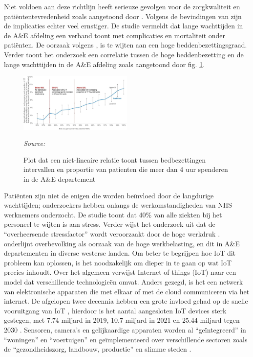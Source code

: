 Niet voldoen aan deze richtlijn heeft serieuze gevolgen voor de zorgkwaliteit en patiëntentevredenheid zoals aangetoond door \autocite{Vainieri2020}. Volgens de bevindingen van \autocite{Paling2020} zijn de implicaties echter veel ernstiger. De studie vermeldt dat lange wachttijden in de A\&E afdeling een verband toont met complicaties en mortaliteit onder patiënten. De oorzaak volgens \autocite{Paling2020}, is te wijten aan een hoge beddenbezettingsgraad. Verder toont het onderzoek een correlatie tussen de hoge beddenbezetting en de lange wachttijden in de A\&E afdeling zoals aangetoond door fig. \ref{fig:Figuur2}.


\begin{figure}[h]
    \centering
    \includegraphics[width=0.5\textwidth]{img/Figuur-2}
    \caption{Plot dat een niet-lineaire relatie toont tussen bedbezettingen intervallen en proportie van patienten die meer dan 4 uur spenderen in de A\&E departement}
    \label{fig:Figuur2}
    \textit{Source: \autocite{Paling2020}}
\end{figure}

Patiënten zijn niet de enigen die worden beïnvloed door de langdurige wachttijden; onderzoekers hebben onlangs de werkomstandigheden van NHS werknemers onderzocht. De studie toont dat 40\% van alle ziekten bij het personeel te wijten is aan stress. Verder wijst het onderzoek uit dat de “overheersende stressfactor” wordt veroorzaakt door de hoge werkdruk \autocite{Ravalier2020}. \autocite{Vainieri2020} onderlijnt overbevolking als oorzaak van de hoge werkbelasting, en dit in A\&E departementen in diverse westerse landen. Om beter te begrijpen hoe IoT dit probleem kan oplossen, is het noodzakelijk om dieper in te gaan op wat IoT precies inhoudt. Over het algemeen verwijst Internet of things (IoT) naar een model dat verschillende technologieën omvat. Anders gezegd, is het een netwerk van elektronische apparaten die met elkaar of met de cloud communiceren via het internet. De afgelopen twee decennia hebben een grote invloed gehad op de snelle vooruitgang van IoT \autocite{Almutairi2024}, hierdoor is het aantal aangesloten IoT devices sterk gestegen, met 7.74 miljard in 2019, 10.7 miljard in 2021 \autocite{Dawod2022} en 25.44 miljard tegen 2030 \autocite{Dawod2022}. Sensoren, camera's en gelijkaardige apparaten worden al “geïntegreerd” in “woningen” en “voertuigen” \autocite{Dawod2022} en geïmplementeerd over verschillende sectoren zoals de “gezondheidszorg, landbouw, productie” en slimme steden \autocite{Almutairi2024}.

